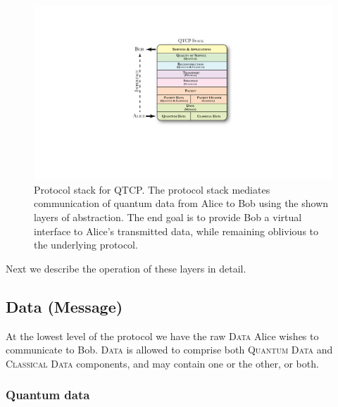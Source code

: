\documentclass[aps, rmp, twocolumn, amsmath, amssymb, nofootinbib, superscriptaddress, longbibliography, floatfix, table-of-contents, eqsecnum]{revtex4-1}
\begin{document}
\begin{figure}[!htb]
\includegraphics[width=\columnwidth]{stack}
\caption{Protocol stack for QTCP. The protocol stack mediates communication of quantum data from Alice to Bob using the shown layers of abstraction. The end goal is to provide Bob a virtual interface to Alice's transmitted data, while remaining oblivious to the underlying protocol.} \label{fig:stack}
\end{figure}

Next we describe the operation of these layers in detail.

%
%

\subsection{Data (Message)} 

At the lowest level of the protocol we have the raw \textsc{Data} Alice wishes to communicate to Bob. \textsc{Data} is allowed to comprise both \textsc{Quantum Data} and \textsc{Classical Data} components, and may contain one or the other, or both.

%
%

\subsubsection{Quantum data} 
\end{document}
